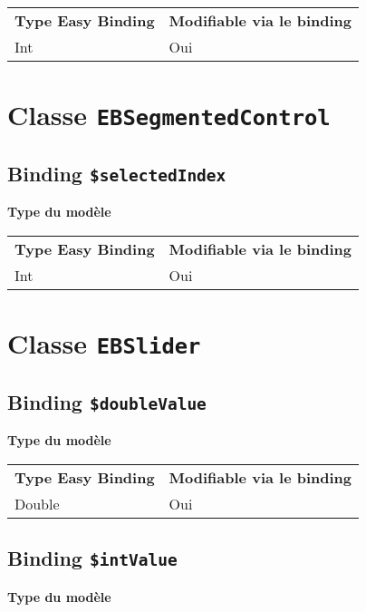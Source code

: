 \begin{tabular}{ll}
\textbf{Type Easy Binding} & \textbf{Modifiable via le binding}\\
Int& Oui\\
\end{tabular}







\section{Classe \texttt{EBSegmentedControl}}

\subsection{Binding \texttt{\$selectedIndex}}

{\bf Type du modèle}

\begin{tabular}{ll}
\textbf{Type Easy Binding} & \textbf{Modifiable via le binding}\\
Int& Oui\\
\end{tabular}







\section{Classe \texttt{EBSlider}}

\subsection{Binding \texttt{\$doubleValue}}

{\bf Type du modèle}

\begin{tabular}{ll}
\textbf{Type Easy Binding} & \textbf{Modifiable via le binding}\\
Double& Oui\\
\end{tabular}
\subsection{Binding \texttt{\$intValue}}

{\bf Type du modèle}

